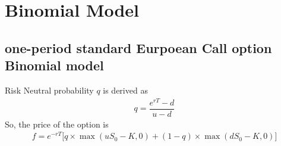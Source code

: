 \documentclass[12pt]{article}
\begin{document}
 

\rhead{\today}
 
\section{Binomial Model}
\subsection*{one-period standard Eurpoean Call option Binomial model}
Risk Neutral probability $q$ is derived as
\begin{align*}
    q = \dfrac{e^{rT}- d}{u-d}
\end{align*}
So, the price of the option is
\begin{align*}
    f = e^{-rT}\Big[q\times \max(uS_0-K, 0) + (1-q)\times \max(dS_0 -K, 0)\Big]
\end{align*}
\end{document}

